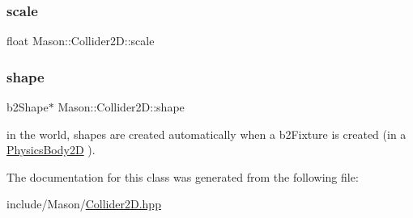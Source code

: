\hypertarget{class_mason_1_1_collider2_d_ac0b6fb4b2bb5add1c96b4e1a8c6c0567}{}\label{class_mason_1_1_collider2_d_ac0b6fb4b2bb5add1c96b4e1a8c6c0567} 
\subsubsection{\texorpdfstring{scale}{scale}}
{\footnotesize\ttfamily float Mason\+::\+Collider2\+D\+::scale\hspace{0.3cm}{\ttfamily [protected]}}

\hypertarget{class_mason_1_1_collider2_d_a82de033fe10f7da3fd079c7ff54eaf94}{}\label{class_mason_1_1_collider2_d_a82de033fe10f7da3fd079c7ff54eaf94} 
\subsubsection{\texorpdfstring{shape}{shape}}
{\footnotesize\ttfamily b2\+Shape$\ast$ Mason\+::\+Collider2\+D\+::shape\hspace{0.3cm}{\ttfamily [protected]}}



in the world, shapes are created automatically when a b2\+Fixture is created (in a \hyperlink{class_mason_1_1_physics_body2_d}{Physics\+Body2D} ). 



The documentation for this class was generated from the following file\+:\begin{DoxyCompactItemize}
\item 
include/\+Mason/\hyperlink{_collider2_d_8hpp}{Collider2\+D.\+hpp}\end{DoxyCompactItemize}

